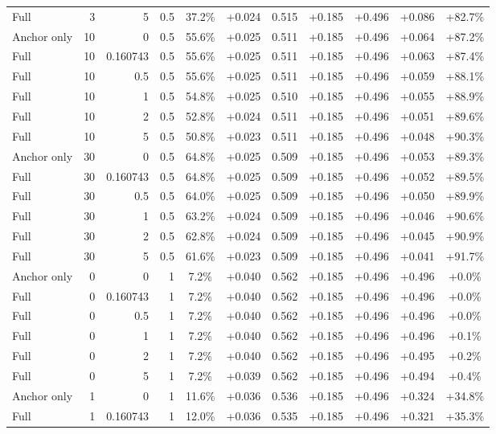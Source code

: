 \begin{table}[htbp]
\begin{tabular}{lrrrccccccc}
Full & 3 & 5 & 0.5 & 37.2\% & +0.024 & 0.515 & +0.185 & +0.496 & +0.086 & +82.7\% \\
Anchor only & 10 & 0 & 0.5 & 55.6\% & +0.025 & 0.511 & +0.185 & +0.496 & +0.064 & +87.2\% \\
Full & 10 & 0.160743 & 0.5 & 55.6\% & +0.025 & 0.511 & +0.185 & +0.496 & +0.063 & +87.4\% \\
Full & 10 & 0.5 & 0.5 & 55.6\% & +0.025 & 0.511 & +0.185 & +0.496 & +0.059 & +88.1\% \\
Full & 10 & 1 & 0.5 & 54.8\% & +0.025 & 0.510 & +0.185 & +0.496 & +0.055 & +88.9\% \\
Full & 10 & 2 & 0.5 & 52.8\% & +0.024 & 0.511 & +0.185 & +0.496 & +0.051 & +89.6\% \\
Full & 10 & 5 & 0.5 & 50.8\% & +0.023 & 0.511 & +0.185 & +0.496 & +0.048 & +90.3\% \\
Anchor only & 30 & 0 & 0.5 & 64.8\% & +0.025 & 0.509 & +0.185 & +0.496 & +0.053 & +89.3\% \\
Full & 30 & 0.160743 & 0.5 & 64.8\% & +0.025 & 0.509 & +0.185 & +0.496 & +0.052 & +89.5\% \\
Full & 30 & 0.5 & 0.5 & 64.0\% & +0.025 & 0.509 & +0.185 & +0.496 & +0.050 & +89.9\% \\
Full & 30 & 1 & 0.5 & 63.2\% & +0.024 & 0.509 & +0.185 & +0.496 & +0.046 & +90.6\% \\
Full & 30 & 2 & 0.5 & 62.8\% & +0.024 & 0.509 & +0.185 & +0.496 & +0.045 & +90.9\% \\
Full & 30 & 5 & 0.5 & 61.6\% & +0.023 & 0.509 & +0.185 & +0.496 & +0.041 & +91.7\% \\
Anchor only & 0 & 0 & 1 & 7.2\% & +0.040 & 0.562 & +0.185 & +0.496 & +0.496 & +0.0\% \\
Full & 0 & 0.160743 & 1 & 7.2\% & +0.040 & 0.562 & +0.185 & +0.496 & +0.496 & +0.0\% \\
Full & 0 & 0.5 & 1 & 7.2\% & +0.040 & 0.562 & +0.185 & +0.496 & +0.496 & +0.0\% \\
Full & 0 & 1 & 1 & 7.2\% & +0.040 & 0.562 & +0.185 & +0.496 & +0.496 & +0.1\% \\
Full & 0 & 2 & 1 & 7.2\% & +0.040 & 0.562 & +0.185 & +0.496 & +0.495 & +0.2\% \\
Full & 0 & 5 & 1 & 7.2\% & +0.039 & 0.562 & +0.185 & +0.496 & +0.494 & +0.4\% \\
Anchor only & 1 & 0 & 1 & 11.6\% & +0.036 & 0.536 & +0.185 & +0.496 & +0.324 & +34.8\% \\
Full & 1 & 0.160743 & 1 & 12.0\% & +0.036 & 0.535 & +0.185 & +0.496 & +0.321 & +35.3\% \\

\end{tabular}
\end{table}
